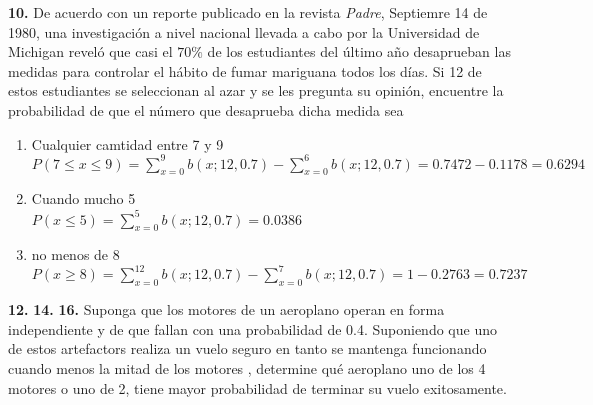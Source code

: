 \documentclass[12pt, letterpaper]{article}
\begin{document}
    \textbf{10. }De acuerdo con un reporte publicado en la revista \textit{Padre}, Septiemre 14 de 1980, una investigación
    a nivel nacional llevada a cabo por la Universidad de Michigan reveló que casi el $70\%$ de los estudiantes del
    último año desaprueban las medidas para controlar el hábito de fumar mariguana todos los días. Si 12 de estos
    estudiantes se seleccionan al azar y se les pregunta su opinión, encuentre la probabilidad de que el número que
    desaprueba dicha medida sea
    \begin{enumerate}
        \item Cualquier camtidad entre 7 y 9\\
            $P(7\leq x\leq 9)=\displaystyle\sum_{x=0}^{9}b(x;12,0.7)-\sum_{x=0}^{6}b(x;12,0.7)=0.7472-0.1178=0.6294$
        \item Cuando mucho 5\\
            $P(x\leq 5)=\displaystyle\sum_{x=0}^{5}b(x;12,0.7)=0.0386$
        \item no menos de 8\\
            $P(x\geq 8)=\displaystyle\sum_{x=0}^{12}b(x;12,0.7)-\sum_{x=0}^{7}b(x;12,0.7)=1-0.2763=0.7237$
    \end{enumerate}\vskip1cm

    \textbf{12. }\vskip1cm
    \textbf{14. }\vskip1cm
    \textbf{16.} Suponga que los motores de un aeroplano operan en forma independiente y de que fallan con una probabilidad de 0.4. Suponiendo que  uno de estos artefactors realiza un vuelo seguro en tanto se mantenga funcionando cuando menos la mitad  de los motores , determine qu\'e aeroplano uno de los 4 motores o uno de 2, tiene mayor probabilidad de terminar su vuelo exitosamente.\\
\end{document}

